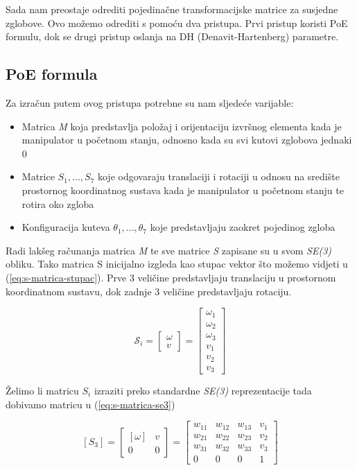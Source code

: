\documentclass[times, utf8, diplomskirad]{fer}
\begin{document}
Sada nam preostaje odrediti pojedinačne transformacijske matrice za susjedne zglobove.
Ovo možemo odrediti s pomoću dva pristupa.
Prvi pristup koristi PoE formulu, dok se drugi pristup oslanja na DH (Denavit-Hartenberg) parametre.
\subsection{PoE formula}
Za izračun putem ovog pristupa potrebne su nam sljedeće varijable:
\begin{itemize}
    \item Matrica \textit{M} koja predstavlja položaj i orijentaciju izvršnog elementa kada je manipulator u početnom stanju, odnosno kada su svi kutovi zglobova jednaki 0
    \item Matrice \textit{$S_1, ..., S_7$} koje odgovaraju translaciji i rotaciji u odnosu na središte prostornog koordinatnog sustava kada je manipulator u početnom stanju te rotira oko zgloba
    \item Konfiguracija kuteva \textit{$\theta_1, ..., \theta_7$} koje predstavljaju zaokret pojedinog zgloba
\end{itemize}
\newpage
Radi lakšeg računanja matrica \textit{M} te sve matrice \textit{S} zapisane su u svom \textit{SE(3)} obliku.
Tako matrica S inicijalno izgleda kao stupac vektor što možemo vidjeti u (\ref{eq:s-matrica-stupac}).
Prve 3 veličine predstavljaju translaciju u prostornom koordinatnom sustavu, dok zadnje 3 veličine predstavljaju rotaciju.

\begin{equation}
    \mathcal{S}_i=\left[\begin{array}{c}
    \omega \\
    v
    \end{array}\right]=\left[\begin{array}{c}
    \omega_1 \\
    \omega_2 \\
    \omega_3 \\
    v_1 \\
    v_2 \\
    v_3
    \end{array}\right]
    \label{eq:s-matrica-stupac}
\end{equation}

Želimo li matricu \textit{$S_i$} izraziti preko standardne \textit{SE(3)} reprezentacije tada dobivamo matricu u (\ref{eq:s-matrica-se3})

\begin{equation}
    \left[S_3\right]=\left[\begin{array}{cc}
    [\omega] & v \\
    0 & 0
\end{array}\right]=
    \left[\begin{array}{cccc}
        w_{11} & w_{12} & w_{13} & v_1 \\
        w_{21} & w_{22} & w_{23} & v_2 \\
        w_{31} & w_{32} & w_{33} & v_3 \\
        0 & 0 & 0 & 1
    \end{array}\right]
    \label{eq:s-matrica-se3}
\end{equation}
\end{document}

